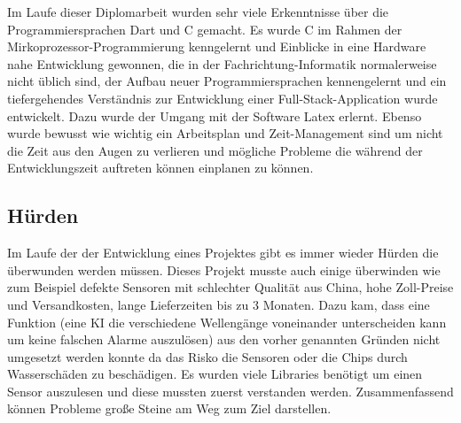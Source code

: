 Im Laufe dieser Diplomarbeit wurden sehr viele Erkenntnisse über die Programmiersprachen Dart und C gemacht. Es wurde C im Rahmen der Mirkoprozessor-Programmierung kenngelernt und Einblicke in eine Hardware nahe Entwicklung gewonnen, 
die in der Fachrichtung-Informatik normalerweise nicht üblich sind, der Aufbau neuer
\newline
Programmiersprachen kennengelernt und ein tiefergehendes Verständnis zur Entwicklung einer 
Full-Stack-Application wurde entwickelt. 
Dazu wurde der Umgang mit der Software Latex erlernt. 
Ebenso wurde bewusst wie wichtig ein Arbeitsplan und Zeit-Management sind um nicht die Zeit aus den Augen zu verlieren und mögliche Probleme die während der Entwicklungszeit auftreten können einplanen zu können.
\subsection*{Hürden}
Im Laufe der der Entwicklung eines Projektes gibt es immer wieder Hürden die überwunden werden müssen.
Dieses Projekt musste auch einige überwinden wie zum Beispiel defekte Sensoren mit schlechter Qualität aus China,
hohe Zoll-Preise und Versandkosten, lange Lieferzeiten bis zu 3 Monaten. Dazu kam, dass eine Funktion
(eine KI die verschiedene Wellengänge voneinander unterscheiden kann um keine falschen Alarme auszulösen)
aus den vorher genannten Gründen nicht umgesetzt werden konnte da das Risko die Sensoren oder die Chips durch Wasserschäden zu beschädigen.
Es wurden viele Libraries benötigt um einen Sensor auszulesen
und diese mussten zuerst verstanden werden.
Zusammenfassend können Probleme große Steine am Weg zum Ziel darstellen.